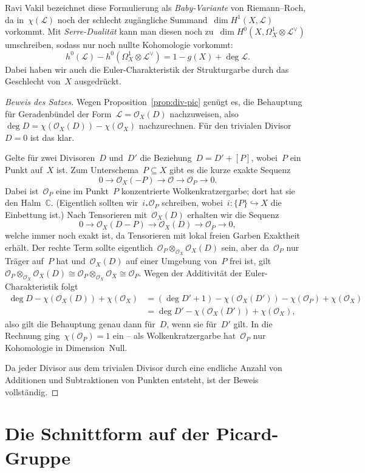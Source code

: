 \documentclass[a4paper,ngerman,12pt]{scrartcl}
\theoremstyle{definition}
\theoremstyle{plain}
\theoremstyle{remark}
\newcommand{\CC}{\mathbb{C}}
\renewcommand{\L}{\mathcal{L}}
\renewcommand{\O}{\mathcal{O}}
\newcommand{\lra}{\longrightarrow}
\begin{document}
Ravi Vakil bezeichnet diese Formulierung als \emph{Baby-Variante} von Riemann--Roch, da
in~$\chi(\L)$ noch der schlecht zugängliche Summand~$\dim H^1(X,\L)$ vorkommt.
Mit \emph{Serre-Dualität} kann man diesen noch zu~$\dim H^0(X,\Omega^1_X
\otimes \L^\vee)$ umschreiben, sodass nur noch
nullte Kohomologie vorkommt:
\[ h^0(\L) - h^0(\Omega^1_X \otimes \L^\vee) = 1-g(X) + \deg\L. \]
Dabei haben wir auch die Euler-Charakteristik der Strukturgarbe durch das
Geschlecht von~$X$ ausgedrückt.

\begin{proof}[Beweis des Satzes]Wegen Proposition~\ref{prop:div-pic} genügt es, die Behauptung für
Geradenbündel der Form~$\L = \O_X(D)$ nachzuweisen, also~$\deg D = \chi(\O_X(D))
- \chi(\O_X)$ nachzurechnen. Für den trivialen Divisor~$D = 0$ ist das klar.

Gelte für zwei Divisoren~$D$ und~$D'$ die Beziehung~$D = D' + [P]$, wobei~$P$
ein Punkt auf~$X$ ist. Zum Unterschema~$P \subseteq X$ gibt es die kurze exakte
Sequenz
\[ 0 \lra \O_X(-P) \lra \O \lra \O_P \lra 0. \]
Dabei ist~$\O_P$ eine im Punkt~$P$ konzentrierte Wolkenkratzergarbe; dort hat
sie den Halm~$\CC$. (Eigentlich sollten wir~$i_* \O_P$ schreiben, wobei~$i : \{P\}
\hookrightarrow X$ die Einbettung ist.) Nach Tensorieren mit~$\O_X(D)$ erhalten
wir die Sequenz
\[ 0 \lra \O_X(D-P) \lra \O_X(D) \lra \O_P \lra 0, \]
welche immer noch exakt ist, da Tensorieren mit lokal freien Garben Exaktheit
erhält. Der rechte Term sollte eigentlich~$\O_P \otimes_{\O_X} \O_X(D)$ sein,
aber da~$\O_P$ nur Träger auf~$P$ hat und~$\O_X(D)$ auf einer Umgebung von~$P$
frei ist, gilt~$\O_P \otimes_{\O_X} \O_X(D) \cong \O_P \otimes_{\O_X} \O_X
\cong \O_P$. Wegen der Additivität der Euler-Charakteristik folgt
\begin{align*}
  \deg D - \chi(\O_X(D)) + \chi(\O_X)
  &= (\deg D' + 1) - \chi(\O_X(D')) - \chi(\O_P) + \chi(\O_X) \\
  &= \deg D' - \chi(\O_X(D')) + \chi(\O_X),
\end{align*}
also gilt die Behauptung genau dann für~$D$, wenn sie für~$D'$ gilt. In die
Rechnung ging~$\chi(\O_P) = 1$ ein -- als Wolkenkratzergarbe
hat~$\O_P$ nur Kohomologie in Dimension~Null.

Da jeder Divisor aus dem trivialen Divisor durch eine endliche Anzahl von
Additionen und Subtraktionen von Punkten entsteht, ist der Beweis vollständig.
\end{proof}


\section{Die Schnittform auf der Picard-Gruppe}
\end{document}

